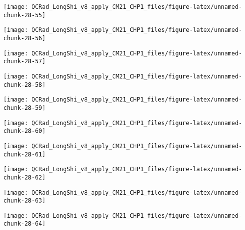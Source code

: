 \documentclass[
  10pt,
  a4paper,oneside]{article}
\begin{document}
\begin{center}\texttt{[image: QCRad\_LongShi\_v8\_apply\_CM21\_CHP1\_files/figure-latex/unnamed-chunk-28-55]} \end{center}

\begin{center}\texttt{[image: QCRad\_LongShi\_v8\_apply\_CM21\_CHP1\_files/figure-latex/unnamed-chunk-28-56]} \end{center}

\begin{center}\texttt{[image: QCRad\_LongShi\_v8\_apply\_CM21\_CHP1\_files/figure-latex/unnamed-chunk-28-57]} \end{center}

\begin{center}\texttt{[image: QCRad\_LongShi\_v8\_apply\_CM21\_CHP1\_files/figure-latex/unnamed-chunk-28-58]} \end{center}

\begin{center}\texttt{[image: QCRad\_LongShi\_v8\_apply\_CM21\_CHP1\_files/figure-latex/unnamed-chunk-28-59]} \end{center}

\begin{center}\texttt{[image: QCRad\_LongShi\_v8\_apply\_CM21\_CHP1\_files/figure-latex/unnamed-chunk-28-60]} \end{center}

\begin{center}\texttt{[image: QCRad\_LongShi\_v8\_apply\_CM21\_CHP1\_files/figure-latex/unnamed-chunk-28-61]} \end{center}

\begin{center}\texttt{[image: QCRad\_LongShi\_v8\_apply\_CM21\_CHP1\_files/figure-latex/unnamed-chunk-28-62]} \end{center}

\begin{center}\texttt{[image: QCRad\_LongShi\_v8\_apply\_CM21\_CHP1\_files/figure-latex/unnamed-chunk-28-63]} \end{center}

\begin{center}\texttt{[image: QCRad\_LongShi\_v8\_apply\_CM21\_CHP1\_files/figure-latex/unnamed-chunk-28-64]} \end{center}
\end{document}
